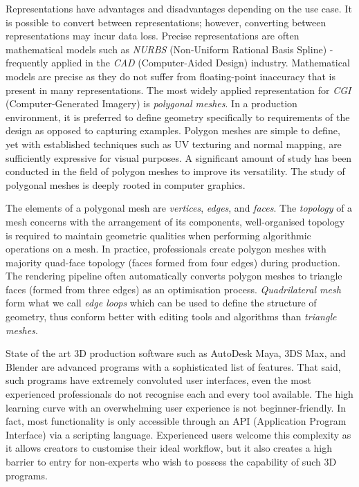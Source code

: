 \documentclass[ %
author={Dillon Keith Diep},
supervisor={Dr. Carl Henrik Ek},
degree={MEng},
title={ART-CG Hair:},
subtitle={Assisted Real-time Content Generation of Stylised Virtual Hair},
type={Research},
year={2017} ]{dissertation}
\begin{document}
Representations have advantages and disadvantages depending on the use case. It is possible to convert between representations; however, converting between representations may incur data loss. Precise representations are often mathematical models such as \textit{NURBS} (Non-Uniform Rational Basis Spline) - frequently applied in the \textit{CAD} (Computer-Aided Design) industry. Mathematical models are precise as they do not suffer from floating-point inaccuracy that is present in many representations. The most widely applied representation for \textit{CGI} (Computer-Generated Imagery) is \textit{polygonal meshes}. In a production environment, it is preferred to define geometry specifically to requirements of the design as opposed to capturing examples. Polygon meshes are simple to define, yet with established techniques such as UV texturing and normal mapping, are sufficiently expressive for visual purposes. A significant amount of study has been conducted in the field of polygon meshes to improve its versatility. The study of polygonal meshes is deeply rooted in computer graphics.

The elements of a polygonal mesh are \textit{vertices}, \textit{edges}, and \textit{faces}. The \textit{topology} of a mesh concerns with the arrangement of its components, well-organised topology is required to maintain geometric qualities when performing algorithmic operations on a mesh. In practice, professionals create polygon meshes with majority quad-face topology (faces formed from four edges) during production. The rendering pipeline often automatically converts polygon meshes to triangle faces (formed from three edges) as an optimisation process. \textit{Quadrilateral mesh} form what we call \textit{edge loops} which can be used to define the structure of geometry, thus conform better with editing tools and algorithms than \textit{triangle meshes}.

State of the art 3D production software such as AutoDesk Maya, 3DS Max, and Blender are advanced programs with a sophisticated list of features. That said, such programs have extremely convoluted user interfaces, even the most experienced professionals do not recognise each and every tool available. The high learning curve with an overwhelming user experience is not beginner-friendly. In fact, most functionality is only accessible through an API (Application Program Interface) via a scripting language.  Experienced users welcome this complexity as it allows creators to customise their ideal workflow, but it also creates a high barrier to entry for non-experts who wish to possess the capability of such 3D programs.
\end{document}
